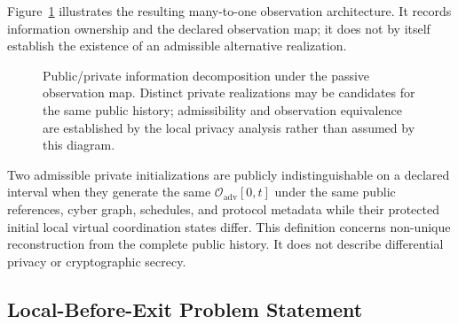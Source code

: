 \documentclass[journal]{IEEEtran}
\begin{document}
Figure~\ref{fig:information_decomposition} illustrates the resulting
many-to-one observation architecture. It records information ownership and the
declared observation map; it does not by itself establish the existence of an
admissible alternative realization.

\begin{figure}[t]
\centering
{}
\caption{Public/private information decomposition under the passive observation
map. Distinct private realizations may be candidates for the same public
history; admissibility and observation equivalence are established by the local
privacy analysis rather than assumed by this diagram.}
\label{fig:information_decomposition}
\end{figure}

Two admissible private initializations are publicly indistinguishable on a declared interval when they generate the same $\mathcal O_{\mathrm{adv}}[0,t]$ under the same public references, cyber graph, schedules, and protocol metadata while their protected initial local virtual coordination states differ. This definition concerns non-unique reconstruction from the complete public history. It does not describe differential privacy or cryptographic secrecy.

\subsection{Local-Before-Exit Problem Statement}
\end{document}
